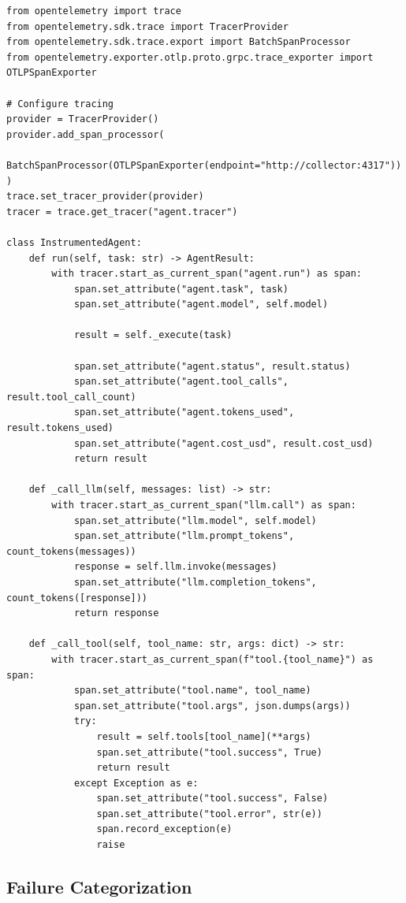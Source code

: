 \begin{lstlisting}[style=pythonstyle, caption={Structured agent tracing with OpenTelemetry}]
from opentelemetry import trace
from opentelemetry.sdk.trace import TracerProvider
from opentelemetry.sdk.trace.export import BatchSpanProcessor
from opentelemetry.exporter.otlp.proto.grpc.trace_exporter import OTLPSpanExporter

# Configure tracing
provider = TracerProvider()
provider.add_span_processor(
    BatchSpanProcessor(OTLPSpanExporter(endpoint="http://collector:4317"))
)
trace.set_tracer_provider(provider)
tracer = trace.get_tracer("agent.tracer")

class InstrumentedAgent:
    def run(self, task: str) -> AgentResult:
        with tracer.start_as_current_span("agent.run") as span:
            span.set_attribute("agent.task", task)
            span.set_attribute("agent.model", self.model)

            result = self._execute(task)

            span.set_attribute("agent.status", result.status)
            span.set_attribute("agent.tool_calls", result.tool_call_count)
            span.set_attribute("agent.tokens_used", result.tokens_used)
            span.set_attribute("agent.cost_usd", result.cost_usd)
            return result

    def _call_llm(self, messages: list) -> str:
        with tracer.start_as_current_span("llm.call") as span:
            span.set_attribute("llm.model", self.model)
            span.set_attribute("llm.prompt_tokens", count_tokens(messages))
            response = self.llm.invoke(messages)
            span.set_attribute("llm.completion_tokens", count_tokens([response]))
            return response

    def _call_tool(self, tool_name: str, args: dict) -> str:
        with tracer.start_as_current_span(f"tool.{tool_name}") as span:
            span.set_attribute("tool.name", tool_name)
            span.set_attribute("tool.args", json.dumps(args))
            try:
                result = self.tools[tool_name](**args)
                span.set_attribute("tool.success", True)
                return result
            except Exception as e:
                span.set_attribute("tool.success", False)
                span.set_attribute("tool.error", str(e))
                span.record_exception(e)
                raise
\end{lstlisting}

\subsection{Failure Categorization}
\label{failure-categorization}

